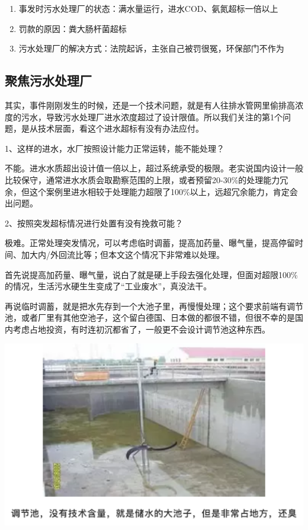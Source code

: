 \documentclass[]{book}
\begin{document}
\begin{enumerate}
\def\labelenumi{\arabic{enumi}.}
\item
  事发时污水处理厂的状态：满水量运行，进水COD、氨氮超标一倍以上
\item
  罚款的原因：粪大肠杆菌超标
\item
  污水处理厂的解决方式：法院起诉，主张自己被罚很冤，环保部门不作为
\end{enumerate}

\hypertarget{ux805aux7126ux6c61ux6c34ux5904ux7406ux5382}{%
\subsection{聚焦污水处理厂}\label{ux805aux7126ux6c61ux6c34ux5904ux7406ux5382}}

其实，事件刚刚发生的时候，还是一个技术问题，就是有人往排水管网里偷排高浓度的污水，导致污水处理厂进水浓度超过了设计限值。所以我们关注的第1个问题，是从技术层面，看这个进水超标有没有办法应付。

1、这样的进水，水厂按照设计能力正常运转，能不能处理？

不能。进水水质超出设计值一倍以上，超过系统承受的极限。老实说国内设计一般比较保守，通常进水水质会取勘察范围的上限，或者预留20-30\%的处理能力冗余，但这个案例里进水相较于处理能力超限了100\%以上，远超冗余能力，肯定会出问题。

2、按照突发超标情况进行处置有没有挽救可能？

极难。正常处理突发情况，可以考虑临时调蓄，提高加药量、曝气量，提高停留时间、加大内/外回流比等；但本文这个情况下非常难以处理。

首先说提高加药量、曝气量，说白了就是硬上手段去强化处理，但面对超限100\%的情况，生活污水硬生生变成了``工业废水''，真没法干。

再说临时调蓄，就是把水先存到一个大池子里，再慢慢处理；这个要求前端有调节池，或者厂里有其他空池子，这个留白德国、日本做的都很不错，但很不幸的是国内考虑占地投资，有时连初沉都省了，一般更不会设计调节池这种东西。

\includegraphics[width=6.67in]{images/py1}
\end{document}
